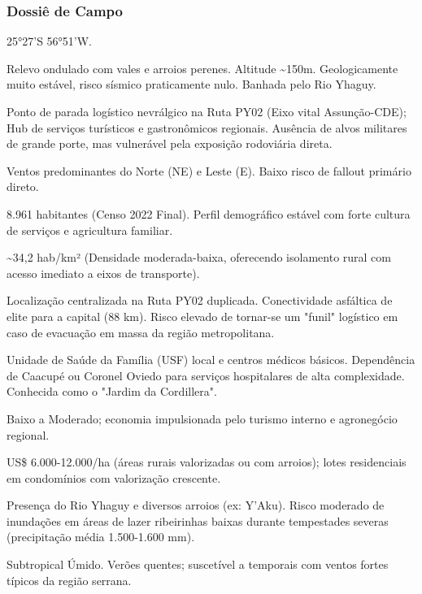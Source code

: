 \subsubsection{Dossiê de Campo}
\begin{description}[style=nextline,leftmargin=0.5cm,font=\bfseries]
\item[Coordenadas]  25°27'S 56°51'W.
\item[Topografia]  Relevo ondulado com vales e arroios perenes. Altitude \textasciitilde 150m. Geologicamente muito estável, risco sísmico praticamente nulo. Banhada pelo Rio Yhaguy.
\item[Alvos Estratégicos]  Ponto de parada logístico nevrálgico na Ruta PY02 (Eixo vital Assunção-CDE); Hub de serviços turísticos e gastronômicos regionais. Ausência de alvos militares de grande porte, mas vulnerável pela exposição rodoviária direta.
\item[Fallout]  Ventos predominantes do Norte (NE) e Leste (E). Baixo risco de fallout primário direto.
\item[População]  8.961 habitantes (Censo 2022 Final). Perfil demográfico estável com forte cultura de serviços e agricultura familiar.
\item[Densidade]  \textasciitilde 34,2 hab/\allowbreak km² (Densidade moderada-baixa, oferecendo isolamento rural com acesso imediato a eixos de transporte).
\item[Vias de Acesso]  Localização centralizada na Ruta PY02 duplicada. Conectividade asfáltica de elite para a capital (88 km). Risco elevado de tornar-se um "funil" logístico em caso de evacuação em massa da região metropolitana.
\item[Serviços]  Unidade de Saúde da Família (USF) local e centros médicos básicos. Dependência de Caacupé ou Coronel Oviedo para serviços hospitalares de alta complexidade. Conhecida como o "Jardim da Cordillera".
\item[Custo de Vida]  Baixo a Moderado; economia impulsionada pelo turismo interno e agronegócio regional.
\item[Preço da Terra]  US\$ 6.000-12.000/\allowbreak ha (áreas rurais valorizadas ou com arroios); lotes residenciais em condomínios com valorização crescente.
\item[Hidrologia]  Presença do Rio Yhaguy e diversos arroios (ex: Y'Aku). Risco moderado de inundações em áreas de lazer ribeirinhas baixas durante tempestades severas (precipitação média 1.500-1.600 mm).
\item[Clima]  Subtropical Úmido. Verões quentes; suscetível a temporais com ventos fortes típicos da região serrana.

\end{description}
